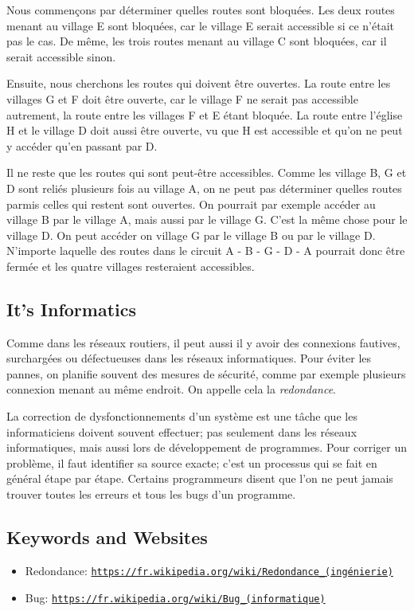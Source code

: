\documentclass[a4paper,11pt]{report}
\newcommand{\BrochureUrlText}[1]{\texttt{#1}}
\newcommand{\taskGraphicsFolder}{..}
\begin{document}
{\centering%
\par}

Nous commençons par déterminer quelles routes sont bloquées. Les deux routes menant au village E sont bloquées, car le village E serait accessible si ce n’était pas le cas. De même, les trois routes menant au village C sont bloquées, car il serait accessible sinon.

Ensuite, nous cherchons les routes qui doivent être ouvertes. La route entre les villages G et F doit être ouverte, car le village F ne serait pas accessible autrement, la route entre les villages F et E étant bloquée. La route entre l’église H et le village D doit aussi être ouverte, vu que H est accessible et qu’on ne peut y accéder qu’en passant par D.

Il ne reste que les routes qui sont peut-être accessibles. Comme les village B, G et D sont reliés plusieurs fois au village A, on ne peut pas déterminer quelles routes parmis celles qui restent sont ouvertes. On pourrait par exemple accéder au village B par le village A, mais aussi par le village G. C’est la même chose pour le village D. On peut accéder on village G par le village B ou par le village D. N’importe laquelle des routes dans le circuit A - B - G - D - A pourrait donc être fermée et les quatre villages resteraient accessibles.


\subsection*{It’s Informatics}

Comme dans les réseaux routiers, il peut aussi il y avoir des connexions fautives, surchargées ou défectueuses dans les réseaux informatiques. Pour éviter les pannes, on planifie souvent des mesures de sécurité, comme par exemple plusieurs connexion menant au même endroit. On appelle cela la \emph{redondance}.

La correction de dysfonctionnements d’un système est une tâche que les informaticiens doivent souvent effectuer; pas seulement dans les réseaux informatiques, mais aussi lors de développement de programmes. Pour corriger un problème, il faut identifier sa source exacte; c’est un processus qui se fait en général étape par étape. Certains programmeurs disent que l’on ne peut jamais trouver toutes les erreurs et tous les bugs d’un programme.

{\raggedright

\subsection*{Keywords and Websites}

\begin{itemize}
  \item Redondance: \href{https://fr.wikipedia.org/wiki/Redondance_(ing\%C3\%A9nierie)}{\BrochureUrlText{https://fr.wikipedia.org/wiki/Redondance\_(ingénierie)}}
  \item Bug: \href{https://fr.wikipedia.org/wiki/Bug_(informatique)}{\BrochureUrlText{https://fr.wikipedia.org/wiki/Bug\_(informatique)}}
\end{itemize}


}
\end{document}
